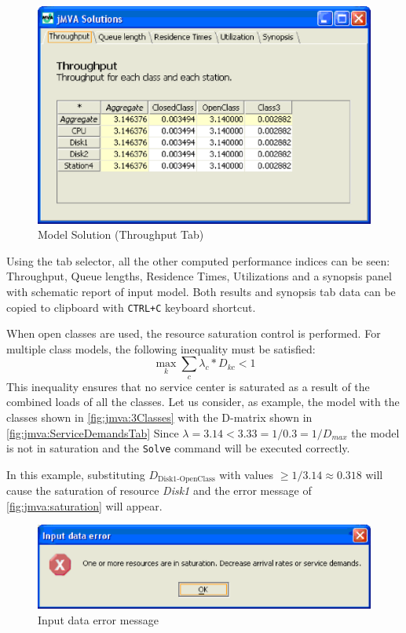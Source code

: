 \begin{figure}[htbp]
    \begin{center}
        \includegraphics[scale=.5]{img/jmva/results}
    \end{center}
    \caption{Model Solution (Throughput Tab)}
    \label{fig:jmva:results}
\end{figure}

Using the tab selector, all the other computed performance indices
can be seen: Throughput, Queue lengths, Residence Times,
Utilizations and a synopsis panel with schematic report of input
model. Both results and synopsis tab data can be copied to clipboard
with \texttt{CTRL+C} keyboard shortcut.

When open classes are used, the resource saturation control is
performed. For multiple class models, the following inequality must
be satisfied:
\[
{\max_k {\sum_c{\lambda_c * D_{kc}}}} < 1
\]
This inequality ensures that no service center is saturated as a
result of the combined loads of all the classes. Let us consider, as
example, the model with the classes shown in
\autoref{fig:jmva:3Classes} with the D-matrix shown in
\autoref{fig:jmva:ServiceDemandsTab} Since $\lambda = 3.14 < 3.33 =
1 / 0.3 = 1 / D_{max}$ the model is not in saturation and the
\texttt{Solve} command will be executed correctly.

In this example, substituting $D_{\textrm{Disk1-OpenClass}}$ with
values $\geq 1/3.14 \approx 0.318$ will cause the saturation of
resource \emph{Disk1} and the error message of
\autoref{fig:jmva:saturation} will appear.

\begin{figure}[htbp]
    \begin{center}
        \includegraphics[scale=.5]{img/jmva/saturation}
    \end{center}
    \caption{Input data error message }
    \label{fig:jmva:saturation}
\end{figure}

